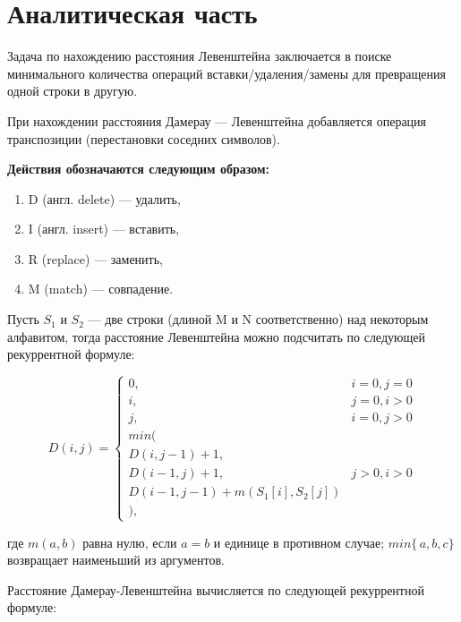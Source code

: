 \chapter{Аналитическая часть}
Задача по нахождению расстояния Левенштейна заключается в поиске минимального количества операций вставки/удаления/замены для превращения одной строки в другую.

При нахождении расстояния Дамерау — Левенштейна добавляется операция транспозиции (перестановки соседних символов).

\textbf{Действия обозначаются следующим образом:}
\begin{enumerate}
    \item D (англ. delete) --- удалить,
    \item I (англ. insert) --- вставить,
    \item R (replace) --- заменить,
    \item M (match) --- совпадение.
\end{enumerate}

Пусть $S_{1}$ и $S_{2}$ — две строки (длиной M и N соответственно) над некоторым алфавитом, тогда расстояние Левенштейна можно подсчитать по следующей рекуррентной формуле:

\begin{displaymath}
    D(i,j) = \left\{ \begin{array}{ll}
        0, & \textrm{$i = 0, j = 0$}\\
        i, & \textrm{$j = 0, i > 0$}\\
        j, & \textrm{$i = 0, j > 0$}\\
        min(\\
        D(i,j-1)+1,\\
        D(i-1, j) +1, &\textrm{$j>0, i>0$}\\
        D(i-1, j-1) + m(S_{1}[i], S_{2}[j])\\
        ),
    \end{array} \right.
\end{displaymath}

где $m(a,b)$ равна нулю, если $a=b$ и единице в противном случае; $min\{\,a,b,c\}$ возвращает наименьший из аргументов.

Расстояние Дамерау-Левенштейна вычисляется по следующей рекуррентной формуле:

